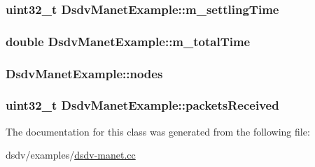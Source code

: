 \subsubsection[{\texorpdfstring{m\+\_\+settling\+Time}{m_settlingTime}}]{\setlength{\rightskip}{0pt plus 5cm}uint32\+\_\+t Dsdv\+Manet\+Example\+::m\+\_\+settling\+Time\hspace{0.3cm}{\ttfamily [private]}}\hypertarget{classDsdvManetExample_aaa43812d7f08d1d314ca3efdcc3d24e2}{}\label{classDsdvManetExample_aaa43812d7f08d1d314ca3efdcc3d24e2}
\subsubsection[{\texorpdfstring{m\+\_\+total\+Time}{m_totalTime}}]{\setlength{\rightskip}{0pt plus 5cm}double Dsdv\+Manet\+Example\+::m\+\_\+total\+Time\hspace{0.3cm}{\ttfamily [private]}}\hypertarget{classDsdvManetExample_ae60447d408304e33046dc852cf7ff083}{}\label{classDsdvManetExample_ae60447d408304e33046dc852cf7ff083}
\subsubsection[{\texorpdfstring{nodes}{nodes}}]{ Dsdv\+Manet\+Example\+::nodes\hspace{0.3cm}{\ttfamily [private]}}\hypertarget{classDsdvManetExample_a0d8c36ee21821999cc05443bb7efbb8f}{}\label{classDsdvManetExample_a0d8c36ee21821999cc05443bb7efbb8f}
\subsubsection[{\texorpdfstring{packets\+Received}{packetsReceived}}]{\setlength{\rightskip}{0pt plus 5cm}uint32\+\_\+t Dsdv\+Manet\+Example\+::packets\+Received\hspace{0.3cm}{\ttfamily [private]}}\hypertarget{classDsdvManetExample_a2b03f3d87eac2f09e1384bbb828e4408}{}\label{classDsdvManetExample_a2b03f3d87eac2f09e1384bbb828e4408}


The documentation for this class was generated from the following file\+:\begin{DoxyCompactItemize}
\item 
dsdv/examples/\hyperlink{dsdv-manet_8cc}{dsdv-\/manet.\+cc}\end{DoxyCompactItemize}
